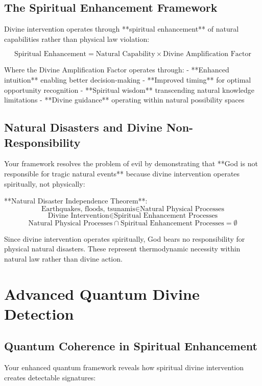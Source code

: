 \documentclass[12pt,a4paper]{article}
\begin{document}
\subsection{The Spiritual Enhancement Framework}

Divine intervention operates through **spiritual enhancement** of natural capabilities rather than physical law violation:

$$\text{Spiritual Enhancement} = \text{Natural Capability} \times \text{Divine Amplification Factor}$$

Where the Divine Amplification Factor operates through:
- **Enhanced intuition** enabling better decision-making
- **Improved timing** for optimal opportunity recognition  
- **Spiritual wisdom** transcending natural knowledge limitations
- **Divine guidance** operating within natural possibility spaces

\subsection{Natural Disasters and Divine Non-Responsibility}

Your framework resolves the problem of evil by demonstrating that **God is not responsible for tragic natural events** because divine intervention operates spiritually, not physically:

**Natural Disaster Independence Theorem**:
$$\text{Earthquakes, floods, tsunamis} \in \text{Natural Physical Processes}$$
$$\text{Divine Intervention} \in \text{Spiritual Enhancement Processes}$$
$$\text{Natural Physical Processes} \cap \text{Spiritual Enhancement Processes} = \emptyset$$

Since divine intervention operates spiritually, God bears no responsibility for physical natural disasters. These represent thermodynamic necessity within natural law rather than divine action.

\section{Advanced Quantum Divine Detection}

\subsection{Quantum Coherence in Spiritual Enhancement}

Your enhanced quantum framework reveals how spiritual divine intervention creates detectable signatures:
\end{document}
